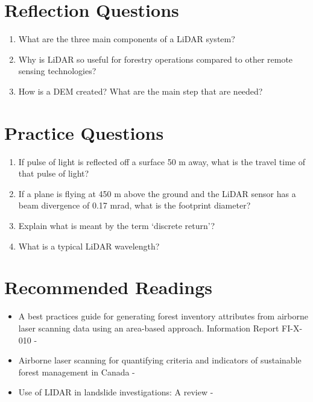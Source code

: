 \documentclass[
]{book}
\providecommand{\tightlist}{%
  \setlength{\itemsep}{0pt}\setlength{\parskip}{0pt}}
\begin{document}
\section*{Reflection Questions}\label{reflection-questions-10}

\begin{enumerate}
\def\labelenumi{\arabic{enumi}.}
\tightlist
\item
  What are the three main components of a LiDAR system?
\item
  Why is LiDAR so useful for forestry operations compared to other remote sensing technologies?
\item
  How is a DEM created? What are the main step that are needed?
\end{enumerate}

\section*{Practice Questions}\label{practice-questions-5}

\begin{enumerate}
\def\labelenumi{\arabic{enumi}.}
\tightlist
\item
  If pulse of light is reflected off a surface 50 m away, what is the travel time of that pulse of light?
\item
  If a plane is flying at 450 m above the ground and the LiDAR sensor has a beam divergence of 0.17 mrad, what is the footprint diameter?
\item
  Explain what is meant by the term `discrete return'?
\item
  What is a typical LiDAR wavelength?
\end{enumerate}

\section*{Recommended Readings}\label{recommended-readings-1}

\begin{itemize}
\tightlist
\item
  A best practices guide for generating forest inventory attributes from airborne laser scanning data using an area-based approach. Information Report FI-X-010 - \citet{white_best_2013}
\item
  Airborne laser scanning for quantifying criteria and indicators of sustainable forest management in Canada - \citet{goodbody_airborne_2021}
\item
  Use of LIDAR in landslide investigations: A review - \citet{jaboyedoff_use_2012}
\end{itemize}

\renewcommand\bibname{Bibliography}
  
\end{document}
